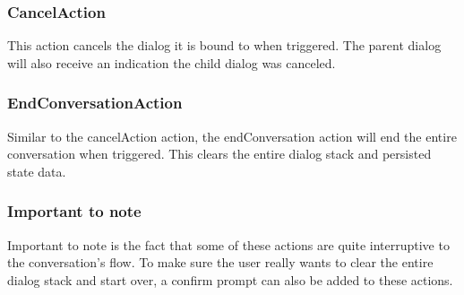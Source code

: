 \subsubsection{CancelAction}

This action cancels the dialog it is bound to when triggered. The parent dialog will also receive an indication the child dialog was canceled.

\subsubsection{EndConversationAction}

Similar to the cancelAction action, the endConversation action will end the entire conversation when triggered. This clears the entire dialog stack and persisted state data.

\subsubsection{Important to note}

Important to note is the fact that some of these actions are quite interruptive to the conversation's flow. To make sure the user really wants to clear the entire dialog stack and start over, a confirm prompt can also be added to these actions.